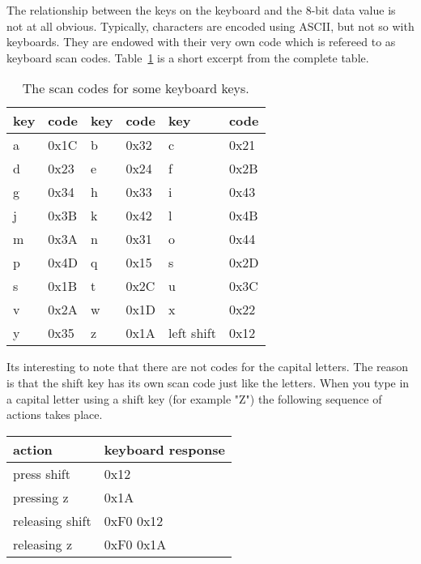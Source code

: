             The relationship between the keys on the keyboard and the 8-bit data
            value is not at all obvious.  Typically, characters are encoded using
            ASCII, but not so with keyboards.  They are endowed with their very
            own code which is refereed to as keyboard scan codes.
            Table~\ref{table:keyboard} is a short excerpt from the complete table.

            \begin{table}
                \begin{tabular}{l|l|l|l|l|l}
                    key & code    & key & code    & key & code \\ \hline \hline
                    a   & 0x1C    & b   & 0x32    & c   & 0x21    \\ \hline
                    d   & 0x23    & e   & 0x24    & f   & 0x2B    \\ \hline
                    g   & 0x34    & h   & 0x33    & i   & 0x43    \\ \hline
                    j   & 0x3B    & k   & 0x42    & l   & 0x4B    \\ \hline
                    m   & 0x3A    & n   & 0x31    & o   & 0x44    \\ \hline
                    p   & 0x4D    & q   & 0x15    & s   & 0x2D    \\ \hline
                    s   & 0x1B    & t   & 0x2C    & u   & 0x3C    \\ \hline
                    v   & 0x2A    & w   & 0x1D    & x   & 0x22    \\ \hline
                    y   & 0x35    & z   & 0x1A    & left shift & 0x12    \\
                \end{tabular}
                \caption{The scan codes for some keyboard keys.}
                \label{table:keyboard}
            \end{table}

            Its interesting to note that there are not codes for the capital
            letters.  The reason is that the shift key has its own scan
            code just like the letters.  When you type in a capital letter
            using a shift key (for example "Z") the following sequence of
            actions takes place.

            \begin{tabular} {l|l}
                action        &    keyboard response    \\ \hline \hline
                press shift    &    0x12            \\ \hline
                pressing z    &    0x1A            \\ \hline
                releasing shift    &    0xF0 0x12        \\ \hline
                releasing z    &    0xF0 0x1A        \\
            \end{tabular}

